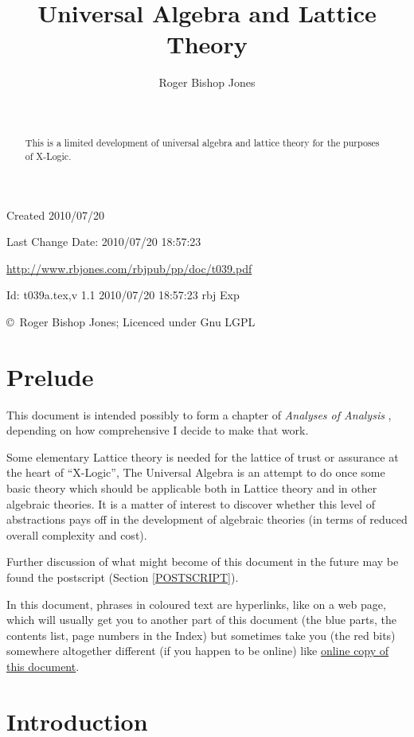 \documentclass[11pt]{article}
\title{Universal Algebra and Lattice Theory}
\author{Roger Bishop Jones}
\date{\ }
\begin{document}
\begin{titlepage}
\maketitle
\begin{abstract}
This is a limited development of universal algebra and lattice theory for the purposes of X-Logic.
\end{abstract}
\vfill

\begin{centering}
{\footnotesize

Created 2010/07/20

Last Change $ $Date: 2010/07/20 18:57:23 $ $

\href{http://www.rbjones.com/rbjpub/pp/doc/t039.pdf}
{http://www.rbjones.com/rbjpub/pp/doc/t039.pdf}

$ $Id: t039a.tex,v 1.1 2010/07/20 18:57:23 rbj Exp $ $

\copyright\ Roger Bishop Jones; Licenced under Gnu LGPL

}%
\end{centering}

\thispagestyle{empty}
\end{titlepage}

\newpage
\addtocounter{page}{1}
{\parskip=0pt\tableofcontents}

\section{Prelude}

This document is intended possibly to form a chapter of {\it Analyses of Analysis} \cite{rbjb001}, depending on how comprehensive I decide to make that work.

Some elementary Lattice theory is needed for the lattice of trust or assurance at the heart of ``X-Logic'',
The Universal Algebra is an attempt to do once some basic theory which should be applicable both in Lattice theory and in other algebraic theories.
It is a matter of interest to discover whether this level of abstractions pays off in the development of algebraic theories (in terms of reduced overall complexity and cost).

Further discussion of what might become of this document in the future may be found the postscript (Section \ref{POSTSCRIPT}).

In this document, phrases in coloured text are hyperlinks, like on a web page, which will usually get you to another part of this document (the blue parts, the contents list, page numbers in the Index) but sometimes take you (the red bits) somewhere altogether different (if you happen to be online) like \href{http://rbjones.com/rbjpub/pp/doc/t039.pdf}{online copy of this document}.

\section{Introduction}
\end{document}
